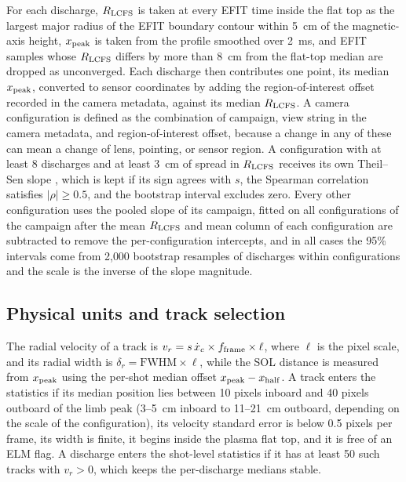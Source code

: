 For each discharge, $R_{\rm LCFS}$ is taken at every EFIT time inside the flat top as the largest major radius of the EFIT boundary contour within 5~cm of the magnetic-axis height, $x_{\rm peak}$ is taken from the profile smoothed over 2~ms, and EFIT samples whose $R_{\rm LCFS}$ differs by more than 8~cm from the flat-top median are dropped as unconverged. Each discharge then contributes one point, its median $x_{\rm peak}$, converted to sensor coordinates by adding the region-of-interest offset recorded in the camera metadata, against its median $R_{\rm LCFS}$. A camera configuration is defined as the combination of campaign, view string in the camera metadata, and region-of-interest offset, because a change in any of these can mean a change of lens, pointing, or sensor region. A configuration with at least 8 discharges and at least 3~cm of spread in $R_{\rm LCFS}$ receives its own Theil--Sen slope \citep{sen1968estimates}, which is kept if its sign agrees with $s$, the Spearman correlation satisfies $|\rho| \ge 0.5$, and the bootstrap interval excludes zero. Every other configuration uses the pooled slope of its campaign, fitted on all configurations of the campaign after the mean $R_{\rm LCFS}$ and mean column of each configuration are subtracted to remove the per-configuration intercepts, and in all cases the 95\% intervals come from 2{,}000 bootstrap resamples of discharges within configurations \citep{efron1993bootstrap} and the scale is the inverse of the slope magnitude.

\subsection{Physical units and track selection}
The radial velocity of a track is $v_r = s\,\dot x_c \times f_{\rm frame} \times \ell$, where $\ell$ is the pixel scale, and its radial width is $\delta_r = \mathrm{FWHM} \times \ell$, while the SOL distance is measured from $x_{\rm peak}$ using the per-shot median offset $x_{\rm peak} - x_{\rm half}$. A track enters the statistics if its median position lies between 10 pixels inboard and 40 pixels outboard of the limb peak (3--5~cm inboard to 11--21~cm outboard, depending on the scale of the configuration), its velocity standard error is below 0.5 pixels per frame, its width is finite, it begins inside the plasma flat top, and it is free of an ELM flag. A discharge enters the shot-level statistics if it has at least 50 such tracks with $v_r > 0$, which keeps the per-discharge medians stable.

